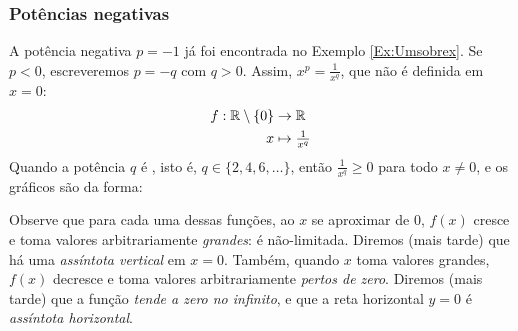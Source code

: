 \subsubsection{Potências negativas}\label{Subsec:graficpotnegativ}
A potência negativa $p={-1}$ já foi encontrada no Exemplo \ref{Ex:Umsobrex}.
Se $p<0$, escreveremos $p=-q$ com $q>0$. Assim, $x^p=\tfrac{1}{x^q}$, que não é definida em $x=0$:
\begin{align*}
 f:\mathbb{R}\setminus\{0\}&\to\mathbb{R}\\
x&\mapsto \tfrac{1}{x^q}
\end{align*}
Quando a potência $q$ é , isto é, $q\in \{ 2,4,6, \dots\}$, então 
$\tfrac{1}{x^{q}}\geq 0$ para todo $x\neq 0$, e os gráficos são da forma:
\begin{center}
\begin{bmlimage}\end{bmlimage}
\end{center}
 Observe que para cada uma dessas funções, ao $x$ se aproximar de $0$, $f(x)$ cresce e
toma valores arbitrariamente \emph{grandes}: é não-limitada. Diremos (mais tarde) que
 há uma \emph{assíntota vertical} em $x=0$. 
Também, quando $x$ toma valores grandes, $f(x)$ decresce e toma 
valores arbitrariamente \emph{pertos de zero}. Diremos (mais tarde) que a função
\emph{tende a zero no infinito}, e que a reta horizontal $y=0$
é \emph{assíntota horizontal}.\\

